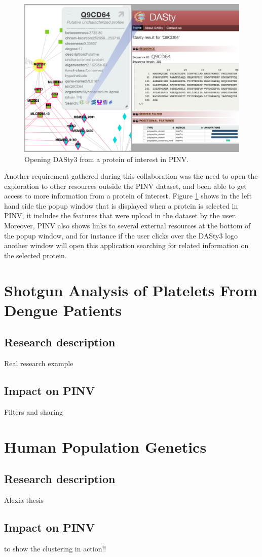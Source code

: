 \begin{figure}
\centering
\includegraphics[width=5in]{figures/pinv2dasty.png}
\caption[Opening DASty3 from a protein of interest in PINV.]{Opening DASty3 from a protein of interest in PINV.
\label{fig:pinv2dasty}}
\end{figure}

Another requirement gathered during this collaboration was the need to open the exploration to other resources outside the PINV dataset, and been able to get access to more information from a protein of interest. Figure \ref{fig:pinv2dasty} shows in the left hand side the popup window that is displayed when a protein is selected in PINV, it includes the features that were upload in the dataset by the user. Moreover, PINV also shows links to several external resources at the bottom of the popup window, and for instance if the user clicks over the DASty3 logo another window will open this application searching for related information on the selected protein.



\section{Shotgun Analysis of Platelets From Dengue Patients}
\label{sec:dengue}
\subsection{Research description}
Real research example



\subsection{Impact on PINV}
Filters and sharing

\section{Human Population Genetics}
\label{sec:pop_genetics}
\subsection{Research description}
Alexia thesis
\subsection{Impact on PINV}
to show the clustering in action!! 


